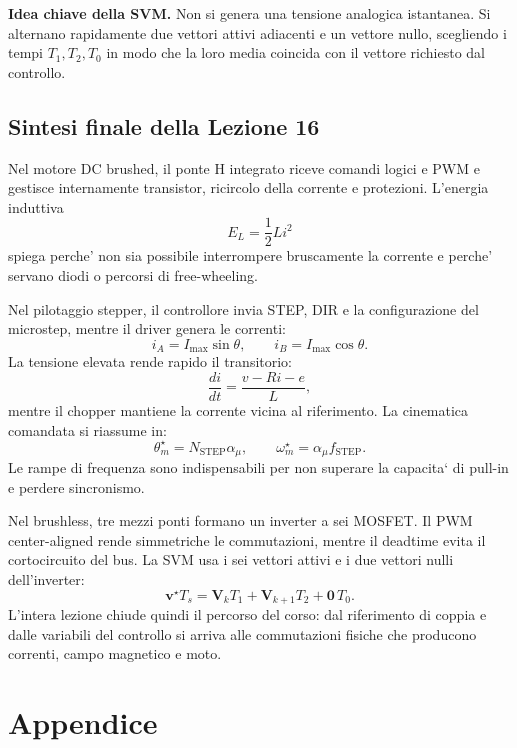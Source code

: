 \documentclass[11pt,a4paper]{article}
\begin{document}
\begin{keybox}
\textbf{Idea chiave della SVM.} Non si genera una tensione analogica istantanea. Si alternano rapidamente due vettori attivi adiacenti e un vettore nullo, scegliendo i tempi \(T_1,T_2,T_0\) in modo che la loro media coincida con il vettore richiesto dal controllo.
\end{keybox}

\subsection*{Sintesi finale della Lezione 16}

Nel motore DC brushed, il ponte H integrato riceve comandi logici e PWM e gestisce internamente transistor, ricircolo della corrente e protezioni. L'energia induttiva
\[
E_L=\frac{1}{2}Li^2
\]
spiega perche' non sia possibile interrompere bruscamente la corrente e perche' servano diodi o percorsi di free-wheeling.

Nel pilotaggio stepper, il controllore invia STEP, DIR e la configurazione del microstep, mentre il driver genera le correnti:
\[
i_A=I_{\max}\sin\theta,
\qquad
i_B=I_{\max}\cos\theta.
\]
La tensione elevata rende rapido il transitorio:
\[
\frac{di}{dt}=\frac{v-Ri-e}{L},
\]
mentre il chopper mantiene la corrente vicina al riferimento. La cinematica comandata si riassume in:
\[
\theta_m^\star=N_{\text{STEP}}\alpha_\mu,
\qquad
\omega_m^\star=\alpha_\mu f_{\text{STEP}}.
\]
Le rampe di frequenza sono indispensabili per non superare la capacita` di pull-in e perdere sincronismo.

Nel brushless, tre mezzi ponti formano un inverter a sei MOSFET. Il PWM center-aligned rende simmetriche le commutazioni, mentre il deadtime evita il cortocircuito del bus. La SVM usa i sei vettori attivi e i due vettori nulli dell'inverter:
\[
\mathbf v^\star T_s
=\mathbf V_k T_1
+\mathbf V_{k+1}T_2
+\mathbf 0\,T_0.
\]
L'intera lezione chiude quindi il percorso del corso: dal riferimento di coppia e dalle variabili del controllo si arriva alle commutazioni fisiche che producono correnti, campo magnetico e moto.


\clearpage
{}
\section*{Appendice}
\end{document}
